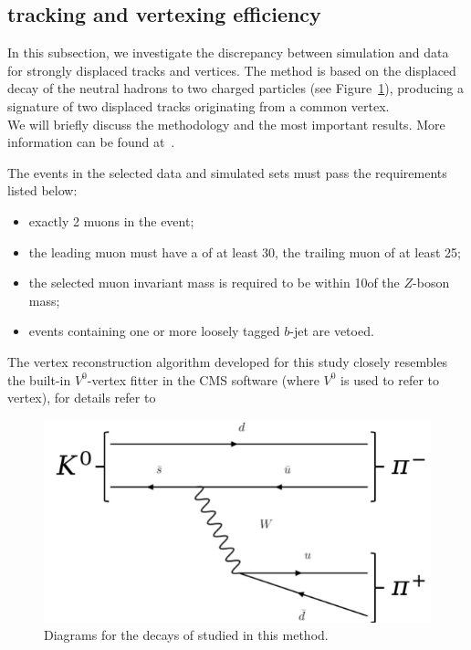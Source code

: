 \subsection{\Displ tracking and vertexing efficiency}
\label{sec:displacedvertex}

In this subsection, we investigate the discrepancy between simulation
and data for strongly displaced tracks and vertices. 
The method is based on the displaced decay of the
neutral hadrons \PKzS to two charged particles (see
Figure~\ref{fig:svdiagrams}), producing a signature of two displaced tracks
originating from a common vertex.\\
We will briefly discuss the methodology
and the most important results. More information can be found at~\cite{AN-20-111_KshortStudy}.

\noindent The events in the selected data and simulated sets must pass the requirements listed below:
\begin{itemize}
\setlength\itemsep{-0.2em}
    \item exactly 2 muons in the event;
    \item the leading muon must have a \pt of at least 30\GeV, the trailing muon of at least 25\GeV;
    \item the selected muon invariant mass is required to be within 10\GeV of the $Z$-boson mass;
    \item events containing one or more loosely tagged $b$-jet are vetoed.
\end{itemize}
The vertex reconstruction algorithm developed for this study closely
resembles the built-in $V^0$-vertex fitter in the CMS software (where
$V^0$ is used to refer to
 \PKzS vertex), for details refer to
\begin{figure}
   \includegraphics[width=0.8\linewidth]{Figures/c6/efficiencies/diagram_ks}
   \caption{Diagrams for the decays of \PKzS studied in this method.}
    \label{fig:svdiagrams}
\end{figure}
